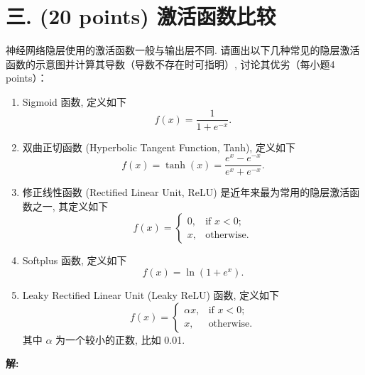 \documentclass[8pt]{article}
\begin{document}
\section*{三. (20 points) 激活函数比较}
神经网络隐层使用的激活函数一般与输出层不同. 请画出以下几种常见的隐层激活函数的示意图并计算其导数（导数不存在时可指明）, 讨论其优劣（每小题4 points）：

\begin{enumerate}
    \item Sigmoid 函数, 定义如下
    \begin{equation}
        f(x) = \frac{1}{1 + e^{-x}}.
        \label{eq:sigmoid}
    \end{equation}
    \item 双曲正切函数 (Hyperbolic Tangent Function, Tanh), 定义如下
    \begin{equation}
        f(x) = \tanh(x) = \frac{e^x - e^{-x}}{e^x + e^{-x}}.
        \label{eq:tanh}
    \end{equation}

    \item 修正线性函数 (Rectified Linear Unit, ReLU) 是近年来最为常用的隐层激活函数之一, 其定义如下
    \begin{equation}
        f(x) = \begin{cases}
            0, & \text{if } x < 0; \\
            x, & \text{otherwise}.
        \end{cases}
        \label{eq:relu}
    \end{equation}

    \item Softplus 函数, 定义如下
    \begin{equation}
        f(x) = \ln(1 + e^x).
        \label{eq:softplus}
    \end{equation}

    \item Leaky Rectified Linear Unit (Leaky ReLU) 函数, 定义如下
    \begin{equation}
        f(x) = \begin{cases}
            \alpha x, & \text{if } x < 0; \\
            x, & \text{otherwise}.
        \end{cases}
        \label{eq:leaky_relu}
    \end{equation}
    其中 $\alpha$ 为一个较小的正数, 比如 0.01.
\end{enumerate}

\textbf{\large 解:}
\end{document}
